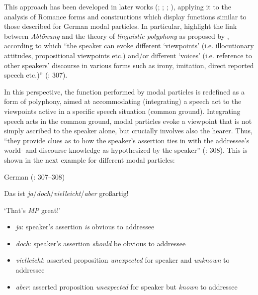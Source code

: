 This approach has been developed in later works (\citealt{Waltereit2006}; \citealt{WaltereitDetges2007}; \citealt{DetgesWaltereit2009}; \citealt{DetgesGévaudan2018}), applying it to the analysis of Romance forms and constructions which display functions similar to those described for German modal particles. In particular, \citet{DetgesGévaudan2018} highlight the link between \textit{Abtönung} and the theory of \textit{linguistic polyphony} as proposed by \citet{Ducrot1984}, according to which “the speaker can evoke different ‘viewpoints’ (i.e. illocutionary attitudes, propositional viewpoints etc.) and/or different ‘voices’ (i.e. reference to other speakers’ discourse in various forms such as irony, imitation, direct reported speech etc.)” (\citealt{DetgesGévaudan2018}: 307).

In this perspective, the function performed by modal particles is redefined as a form of polyphony, aimed at accommodating (integrating) a speech act to the viewpoints active in a specific speech situation (common ground). Integrating speech acts in the common ground, modal particles evoke a viewpoint that is not simply ascribed to the speaker alone, but crucially involves also the hearer. Thus, “they provide clues as to how the speaker’s assertion ties in with the addressee’s world- and discourse knowledge as hypothesized by the speaker” (\citealt{DetgesGévaudan2018}: 308). This is shown in the next example for different modal particles:

\ea%
    \label{ex:key:8}

          German (\citealt{DetgesGévaudan2018}: 307–308)

Das ist \textit{ja}/\textit{doch}/\textit{vielleicht}/\textit{aber} großartig!

\glt ‘That’s \textit{MP} great!’

\begin{itemize}
    
\item \textit{ja}: speaker’s assertion \textit{is} obvious to addressee

\item \textit{doch}: speaker’s assertion \textit{should} be obvious to addressee

\item \textit{vielleicht}: asserted proposition \textit{unexpected} for speaker and \textit{unknown} to addressee

\item \textit{aber}: asserted proposition \textit{unexpected} for speaker but \textit{known} to addressee
\end{itemize}
    \z %


